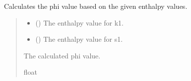 \documentclass[a4paper,11pt,english,openany]{sphinxmanual}
\begin{document}
\begin{fulllineitems}
\label{\detokenize{api/spyice.update_physical_values:spyice.update_physical_values.phi_func}}
\pysigstartsignatures
{}
\pysigstopsignatures
\sphinxAtStartPar
Calculates the phi value based on the given enthalpy values.
\begin{quote}\begin{description}
\begin{itemize}
\item {} 
\sphinxAtStartPar
{} () \textendash{} The enthalpy value for k1.

\item {} 
\sphinxAtStartPar
{} () \textendash{} The enthalpy value for s1.

\end{itemize}

\sphinxAtStartPar
The calculated phi value.

\sphinxAtStartPar
float

\end{description}\end{quote}

\end{fulllineitems}

\end{document}
